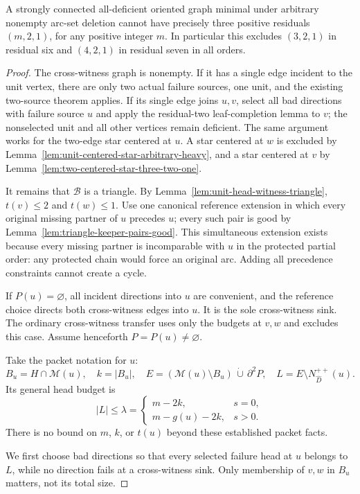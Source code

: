 \begin{theorem}\label{thm:no-three-two-one}
A strongly connected all-deficient oriented graph minimal under
arbitrary nonempty arc-set deletion cannot have precisely three
positive residuals $(m,2,1)$, for any positive integer $m$.
In particular this excludes $(3,2,1)$ in residual six and
$(4,2,1)$ in residual seven in all orders.
\end{theorem}
\begin{proof}
The cross-witness graph is nonempty.  If it has a single edge incident
to the unit vertex, there are only two actual failure sources, one
unit, and the existing two-source theorem applies.  If its single
edge joins $u,v$, select all bad directions with failure source $u$
and apply the residual-two leaf-completion lemma to $v$; the
nonselected unit and all other vertices remain deficient.  The same
argument works for the two-edge star centered at $u$.  A star centered
at $w$ is excluded by Lemma~\ref{lem:unit-centered-star-arbitrary-heavy},
and a star centered at $v$ by
Lemma~\ref{lem:two-centered-star-three-two-one}.

It remains that $\mathcal B$ is a triangle.  By
Lemma~\ref{lem:unit-head-witness-triangle}, $t(v)\le2$ and $t(w)\le1$.
Use one canonical reference extension in which every original
missing partner of $u$ precedes $u$; every such pair is good by
Lemma~\ref{lem:triangle-keeper-pairs-good}.
This simultaneous extension exists because every missing partner
is incomparable with $u$ in the protected partial order: any
protected chain would force an original arc.  Adding all precedence
constraints cannot create a cycle.

If $P(u)=\varnothing$, all incident directions into $u$ are
convenient, and the reference choice directs both cross-witness
edges into $u$.  It is the sole cross-witness sink.  The ordinary
cross-witness transfer uses only the budgets at $v,w$ and excludes
this case.  Assume henceforth $P=P(u)\ne\varnothing$.

Take the packet notation for $u$:
\[
 B_u=H\cap\mathcal M(u),\quad k=|B_u|,\quad
 E=(\mathcal M(u)\setminus B_u)\,\dot\cup\,\partial^2P,\quad
 L=E\setminus N_{\widehat D}^{++}(u).
\]
Its general head budget is
\[
 |L|\le\lambda=
 \begin{cases}m-2k,&s=0,\\m-g(u)-2k,&s>0.\end{cases}
\]
There is no bound on $m$, $k$, or $t(u)$ beyond these established
packet facts.

We first choose bad directions so that every selected failure head
at $u$ belongs to $L$, while no direction fails at a cross-witness
sink.  Only membership of $v,w$ in $B_u$ matters, not its total size.


\end{proof}
